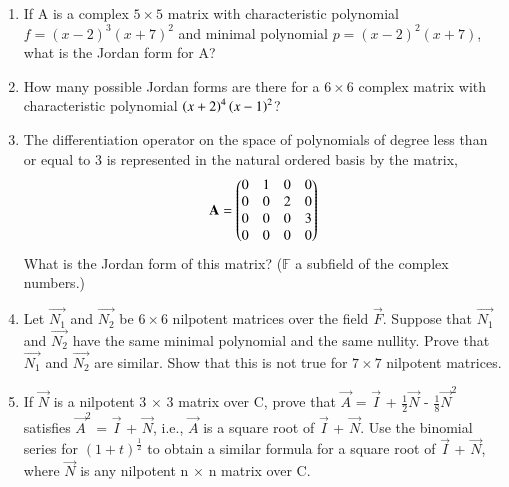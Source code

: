 \renewcommand{\theequation}{\theenumi}
\renewcommand{\thefigure}{\theenumi}
\begin{enumerate}[label=\thesubsection.\arabic*.,ref=\thesubsection.\theenumi]

\item If A is a complex $5 \times 5$ matrix with characteristic polynomial $f = (x-2)^3 (x+7)^2$ and minimal polynomial $p = (x-2)^2 (x+7)$, what is the Jordan form for A? 
%
\\
\solution

\item How many possible Jordan forms are there for a $6\times6$ complex matrix with characteristic polynomial $\left(x+2\right)^4\left(x-1\right)^2$?
%
\\
\solution


\item The differentiation operator on the space of polynomials of degree less than or equal to 3 is represented in the natural ordered basis by the matrix,
\begin{align}
\mathbf{A} = \begin{pmatrix}0&1&0&0\\0&0&2&0\\0&0&0&3\\0&0&0&0\end{pmatrix}
\end{align}
What is the Jordan form of this matrix? ($\mathbb{F}$ a subfield of the complex numbers.) 
%
%
\\
\solution

\item Let $\vec{N_1}$ and $\vec{N_2}$ be $6 \times 6$ nilpotent matrices over the field $\vec{F}$. Suppose that $\vec{N_1}$ and $\vec{N_2}$ have the same minimal polynomial and the same nullity. Prove that $\vec{N_1}$ and $\vec{N_2}$ are similar. Show that this is not true for $7 \times 7$ nilpotent matrices.
%
\\
\solution

\twocolumn
\item If $\vec{N}$ is a nilpotent 3 $\times$ 3 matrix over C, prove that $\vec{A}$ = $\vec{I}$ + $\frac{1}{2}\vec{N}$ - $\frac{1}{8}\vec{N}^{2}$ satisfies $\vec{A}^2$ = $\vec{I}$ + $\vec{N}$, i.e., $\vec{A}$ is a square root of $\vec{I}$ + $\vec{N}$. Use the binomial series for $(1 + t)^\frac{1}{2}$ to obtain a similar formula for a square root of $\vec{I}$ + $\vec{N}$, where $\vec{N}$ is any nilpotent n $\times$ n matrix over C.
%
\\
\solution



\end{enumerate}
